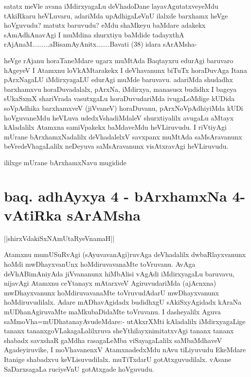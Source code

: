 \begin{artha}
satatx meVle avana iMdirxyagaLu deVhadoDane layavAgutatxveyeMdu tAkiRkaru heVLuvaru, adariMda upAdhigaLeVnU ilalxde barxhamx heVge hoVguvudu? matutx baruvudu? eMdu shaMkeyu baMdare adakekx sAmAdhAnavAgi I muMdina shurxtiyu baMdide tadayxthA rAjAnaM.........aBisamAyAnitx.......Bavati (38) idara sArAMsha-
\end{artha}

\begin{artha}
heVge rAjanu horaTaneMdare ugarx muMtAda Baqtayxru edurAgi baruvaro hAgeyeV I Atamxnu loVkAMtarakekx I deVhavanunx biTuTx horaDuvAga Itana pArxNagaLU iMdirxyagaLU edurAgi muMde baruvavu. adariMda shudadhx barxhamxvu horaDuvadalalx, pArxNa, iMdirxya, manasusx budidhx I bageya sUkaSxmX shariVrada vasutxgaLu horaDuvudariMda ivugaLoMdige kUDida soVpAdhika barxhamxveV (jiVvaneV) horaDuvanu, pArxNoVpAdhiyiMda kUDi hoVguvaneMdu heVLuva udedxVshadiMdaleV shurxtiyalilx avugaLu aMtayx kAladalilx Atamxna samiVpakekx baMdaveMdu heVLiruvudu. I riVtiyAgi mUrane bArxhamxNadalilx deVhadalelxV savxpanx muMtAda saMsAravanunx beVredeVhagaLalilx neDeyuva saMsAravanunx visAtxravAgi heVLiruvudu.
\end{artha}

\begin{center}
ililxge mUrane bArxhamxNavu mugidide
\end{center}

\section*{baq. adhAyxya 4 - bArxhamxNa 4-vAtiRka sArAMsha}

\begin{center}
||shirxVdakiSxNAmUtaRyeVnamaH||
\end{center}


\begin{artha}
Atamxnu mumUSuRvAgi (sAyuvavanAgi)ruvAga deVhadalilx dwbaRlayxvanunx hoMdi mwDhayxvanUnx hoMdiruvavanaMte toVruvanu. AvAga deVhABimAniyAda jiVvananunx hiMbAlisi vAgAdi iMdirxyagaLu baruvavu, nijavAgi Atamxnu ceYtanayx mAtarxveV AgiruvudariMda (ajAcnxna) mwDhayxvanunx hoMdiruvavanaMte toVruvudAdarU mwDhayxvanunx hoMdiruvudilalx. Adare mADhavAgidadx budidhxgU sAkiSxyAgidadx kAraNa mUDhanAgiruvaMte maMkubaDidaMte toVruvanu. I dasheyalilx Aguva saMmoVha=mUDhatanayAvudeMdare:- utAkxrXMti kAladalilx iMdirxyagaLige tananx tananxgoVLakagaLalilxruva sheYthilayxnimitatxvAgi tananx tananx shabadx savxshaR gaMdha rasagaLeMba viSayagaLalilx saMbaMdhaveV Agadeyiruvike, I moVhavanenxV AtamxnadedxMdu nAvu tiLiyuvudu EkeMdare Itanige shabadxvu keVLisuvudilalx. muTiTxdarU gotAtxguvudilalx. vAsane SaDarxsagaLa ruciyeVnU gotAtxgade hoVguvudu.
\end{artha}

